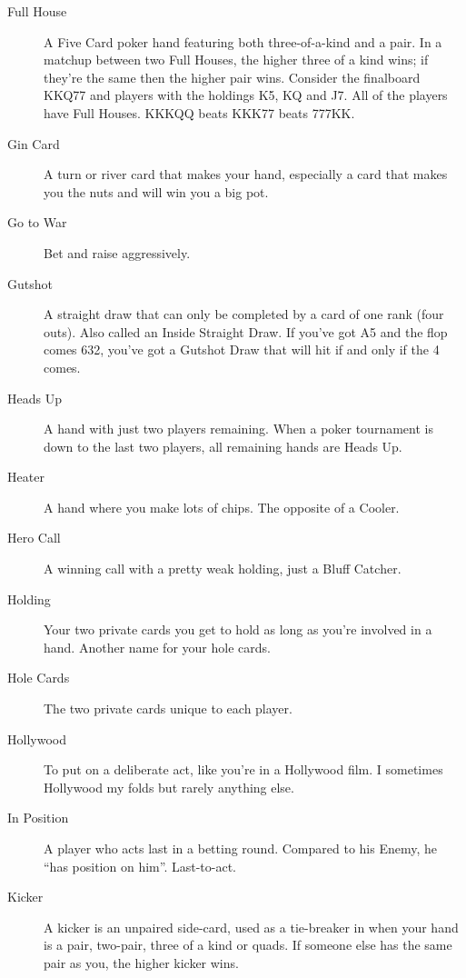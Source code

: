 \begin{description}
\item[Full House] A Five Card poker hand featuring both
three-of-a-kind and a pair. In a matchup between two Full Houses, the
higher three of a kind wins; if they're the same then the higher pair
wins. Consider the finalboard KKQ77 and players with the holdings K5,
KQ and J7. All of the players have Full Houses. KKKQQ beats KKK77
beats 777KK.

\item[Gin Card] A turn or river card that makes your hand, especially
a card that makes you the nuts and will win you a big pot.

\item[Go to War] Bet and raise aggressively.

\item[Gutshot] A straight draw that can only be completed by a card of
one rank (four outs). Also called an Inside Straight Draw. If you've
got A5 and the flop comes 632, you've got a Gutshot Draw that will hit
if and only if the 4 comes.

\item[Heads Up] A hand with just two players remaining. When a poker
tournament is down to the last two players, all remaining hands are
Heads Up.

\item[Heater] A hand where you make lots of chips. The opposite of a
Cooler.

\item[Hero Call] A winning call with a pretty weak holding, just a
Bluff Catcher.

\item[Holding] Your two private cards you get to hold as long as
you're involved in a hand. Another name for your hole cards.

\item[Hole Cards] The two private cards unique to each player.

\item[Hollywood] To put on a deliberate act, like you're in a
Hollywood film. I sometimes Hollywood my folds but rarely anything
else.

\item[In Position] A player who acts last in a betting round. Compared
to his Enemy, he ``has position on him''. Last-to-act.

\item[Kicker] A kicker is an unpaired side-card, used as a tie-breaker
in when your hand is a pair, two-pair, three of a kind or quads. If
someone else has the same pair as you, the higher kicker wins.


\end{description}
